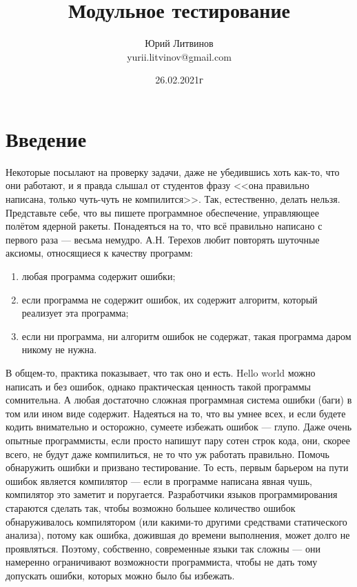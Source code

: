 \documentclass[a5paper]{article}
\title{Модульное тестирование}
\author{Юрий Литвинов\\\small{yurii.litvinov@gmail.com}}
\date{26.02.2021г}
\begin{document}
\maketitle
\thispagestyle{empty}

\section{Введение}

Некоторые посылают на проверку задачи, даже не убедившись хоть как-то, что они работают, и я правда слышал от студентов фразу <<она правильно написана, только чуть-чуть не компилится>>. Так, естественно, делать нельзя. Представьте себе, что вы пишете программное обеспечение, управляющее полётом ядерной ракеты. Понадеяться на то, что всё правильно написано с первого раза --- весьма немудро. А.Н. Терехов любит повторять шуточные аксиомы, относящиеся к качеству программ:

\begin{enumerate}
    \item любая программа содержит ошибки;
    \item если программа не содержит ошибок, их содержит алгоритм, который реализует эта программа;
    \item если ни программа, ни алгоритм ошибок не содержат, такая программа даром никому не нужна.
\end{enumerate}

В общем-то, практика показывает, что так оно и есть. Hello world можно написать и без ошибок, однако практическая ценность такой программы сомнительна. А любая достаточно сложная программная система ошибки (баги) в том или ином виде содержит. Надеяться на то, что вы умнее всех, и если будете кодить внимательно и осторожно, сумеете избежать ошибок --- глупо. Даже очень опытные программисты, если просто напишут пару сотен строк кода, они, скорее всего, не будут даже компилиться, не то что уж работать правильно. Помочь обнаружить ошибки и призвано тестирование. То есть, первым барьером на пути ошибок является компилятор --- если в программе написана явная чушь, компилятор это заметит и поругается. Разработчики языков программирования стараются сделать так, чтобы возможно большее количество ошибок обнаруживалось компилятором (или какими-то другими средствами статического анализа), потому как ошибка, дожившая до времени выполнения, может долго не проявляться. Поэтому, собственно, современные языки так сложны --- они намеренно ограничивают возможности программиста, чтобы не дать тому допускать ошибки, которых можно было бы избежать.
\end{document}
